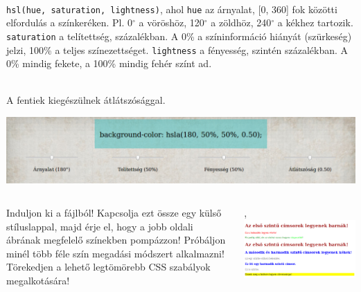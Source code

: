 \begin{frame}
  \begin{description}[m]
    \item[\texttt{hsl()} függvénnyel] \hfill \\ \texttt{hsl(hue, 
    saturation, lightness)}, ahol \texttt{hue} az árnyalat, [0, 360] 
    fok közötti elfordulás a színkeréken. Pl. 0$^{\circ}$ a 
    vöröshöz, 120$^{\circ}$ a zöldhöz, 240$^{\circ}$ a kékhez 
    tartozik. \texttt{saturation} a telítettség, százalékban. A 0\% 
    a színinformáció hiányát (szürkeség) jelzi, 100\% a teljes 
    színezettséget. \texttt{lightness} a fényesség, szintén 
    százalékban. A 0\% mindig fekete, a 100\% mindig fehér színt ad.
    \item[\texttt{hsla()} függvénnyel] \hfill \\ A fentiek 
    kiegészülnek átlátszósággal.
  \end{description}
  \vfill
  \begin{center}
    \includegraphics[scale=0.2]{szinek2.png}\\
  \end{center}
\end{frame}

\begin{frame}
  \begin{columns}[c]
      Induljon ki a  
      fájlból! Kapcsolja ezt össze egy külső stíluslappal, majd 
      érje el, hogy a jobb oldali ábrának megfelelő színekben 
      pompázzon! Próbáljon minél több féle szín megadási 
      módszert alkalmazni! Törekedjen a lehető legtömörebb CSS 
      szabályok megalkotására!
      \begin{exampleblock}{, 
        }
        \includegraphics[width=\textwidth]{szinezes-mo.png}
      \end{exampleblock}
  \end{columns} 
\end{frame}
